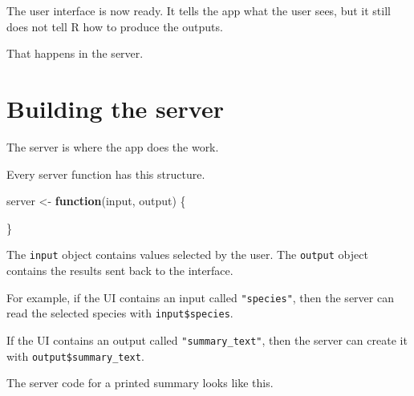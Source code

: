 \documentclass[
  letterpaper,
  DIV=11,
  numbers=noendperiod]{scrreprt}
\newenvironment{Shaded}{\begin{snugshade}}{\end{snugshade}}
\newcommand{\ControlFlowTok}[1]{\textcolor[rgb]{0.00,0.23,0.31}{\textbf{#1}}}
\newcommand{\NormalTok}[1]{\textcolor[rgb]{0.00,0.23,0.31}{#1}}
\newcommand{\OtherTok}[1]{\textcolor[rgb]{0.00,0.23,0.31}{#1}}
\begin{document}
The user interface is now ready. It tells the app what the user sees,
but it still does not tell R how to produce the outputs.

That happens in the server.

\section{Building the server}\label{building-the-server}

The server is where the app does the work.

Every server function has this structure.

\begin{Shaded}
\begin{Highlighting}[]
\NormalTok{server }\OtherTok{\textless{}{-}} \ControlFlowTok{function}\NormalTok{(input, output) \{}
  
\NormalTok{\}}
\end{Highlighting}
\end{Shaded}

The \texttt{input} object contains values selected by the user. The
\texttt{output} object contains the results sent back to the interface.

For example, if the UI contains an input called \texttt{"species"}, then
the server can read the selected species with \texttt{input\$species}.

If the UI contains an output called \texttt{"summary\_text"}, then the
server can create it with \texttt{output\$summary\_text}.

The server code for a printed summary looks like this.
\end{document}
